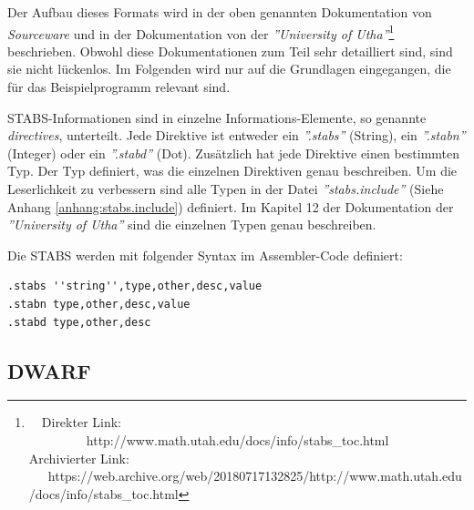 Der Aufbau dieses Formats wird in der oben genannten Dokumentation von \textit{Sourceware} und in der Dokumentation von der \textit{''University of Utha''}\footnote{\ \ Direkter Link: \ \ \ \ \ \ \ \ \ http://www.math.utah.edu/docs/info/stabs\_toc.html\\ Archivierter Link: \ \ \ https://web.archive.org/web/20180717132825/http://www.math.utah.edu/docs/info/stabs\_toc.html} beschrieben.
Obwohl diese Dokumentationen zum Teil sehr detailliert sind, sind sie nicht lückenlos.
Im Folgenden wird nur auf die Grundlagen eingegangen, die für das Beispielprogramm relevant sind.

STABS-Informationen sind in einzelne Informations-Elemente, so genannte \textit{directives}, unterteilt.
Jede Direktive ist entweder ein \textit{''.stabs''} (String), ein \textit{''.stabn''} (Integer) oder ein \textit{''.stabd''} (Dot).
Zusätzlich hat jede Direktive einen bestimmten Typ.
Der Typ definiert, was die einzelnen Direktiven genau beschreiben.
Um die Leserlichkeit zu verbessern sind alle Typen in der Datei \textit{''stabs.include''} (Siehe Anhang \ref{anhang:stabs.include}) definiert.
Im Kapitel 12 der Dokumentation der \textit{''University of Utha''} sind die einzelnen Typen genau beschreiben.

Die STABS werden mit folgender Syntax im Assembler-Code definiert:\\
\lstset{language=plain}
\begin{lstlisting}
.stabs ''string'',type,other,desc,value
.stabn type,other,desc,value
.stabd type,other,desc
\end{lstlisting}



\subsection{DWARF}


